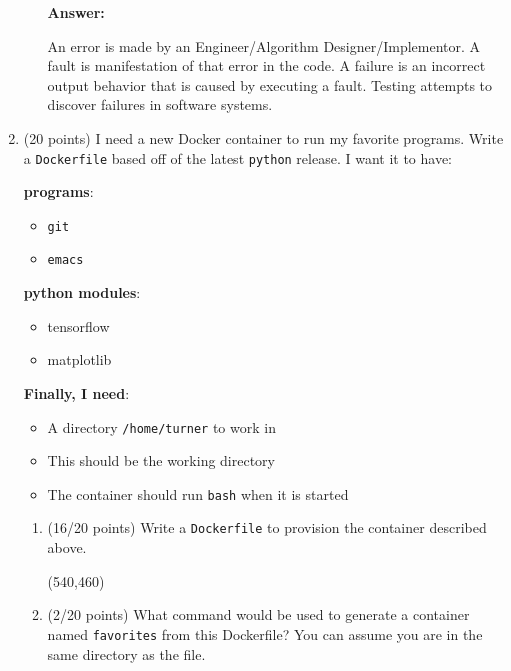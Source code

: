 \documentclass[10pt]{article}
\begin{document}
\begin{enumerate}
\begin{enumerate}
	\beginanswers
		\textbf{Answer:}

		\bigskip
An error is made by an Engineer/Algorithm Designer/Implementor.
A fault is manifestation of that error in the code.
A failure is an incorrect output behavior that is caused by executing a fault.
Testing attempts to discover failures in software systems.
		\bigskip
	\else
	\bigskip
	\bigskip
	\bigskip
	\bigskip
	\bigskip
	\bigskip
	\bigskip
	\bigskip
	\bigskip
	\bigskip
	\bigskip
	\bigskip
	\bigskip
	\bigskip
	\bigskip
	\bigskip
	\bigskip
	\bigskip
	\bigskip
	\bigskip
	\bigskip
	\bigskip
	\fi

\end{enumerate}
	
\newpage


\item (20 points) I need a new Docker container to run my favorite programs. Write a \verb|Dockerfile| based off of the 
	latest \verb|python| release. I want it to have:


	\textbf{programs}: 
	\begin{itemize}
	        \item \verb|git|
	        \item \verb|emacs|
	\end{itemize}

	\textbf{python modules}:
	
	\begin{itemize}
		\item tensorflow
		\item matplotlib
	\end{itemize}

	\textbf{Finally, I need}:
	
	\begin{itemize}
		\item A directory \verb|/home/turner| to work in
		\item This should be the working directory
		\item The container should run \verb|bash| when it is started
	\end{itemize}

	\begin{enumerate} 
		\item (16/20 points) Write a \verb|Dockerfile| to provision the container described above.

\beginanswers

\else
\hspace*{-0.4in}\framebox(540,460){}
\fi

\item (2/20 points) What command would be used to generate a container named \verb|favorites| from this Dockerfile? 
	You can assume you are in
	the same directory as the file.


\end{enumerate}
\end{enumerate}
\end{document}
